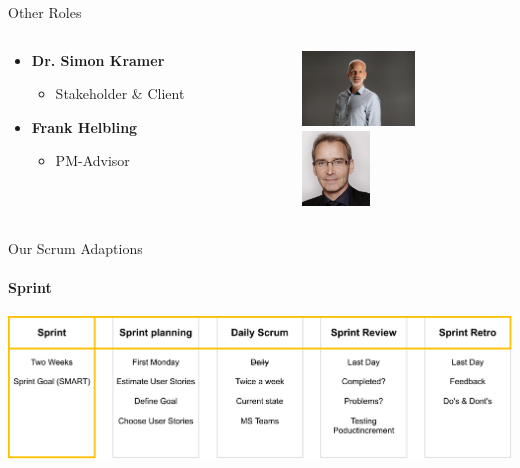 \documentclass[
    ngerman,%
    authorontitle=true,
]{bfhbeamer}
\begin{document}
    \begin{frame}{Other Roles}
        \begin{columns}
            \begin{column}{0.7\textwidth}
                \begin{itemize}
                    \item \textbf{Dr. Simon Kramer}
                    \begin{itemize}
                        \item Stakeholder \& Client
                    \end{itemize}
                    \item \textbf{Frank Helbling}
                    \begin{itemize}
                        \item PM-Advisor
                    \end{itemize}
                \end{itemize}
            \end{column}
            \begin{column}{0.3\textwidth}
                \includegraphics[height=2cm]{pictures/kramer_2} \\
                \vspace{1em}
                \includegraphics[height=2cm]{pictures/helbling_2} \\
                \vspace{1em}
            \end{column}
        \end{columns}
    \end{frame}

    \begin{frame}{Our Scrum Adaptions}
        \framesubtitle{Sprint}
        \includegraphics[width=1\textwidth]{pictures/scrum_adaptions-Sprint}
    \end{frame}
\end{document}
